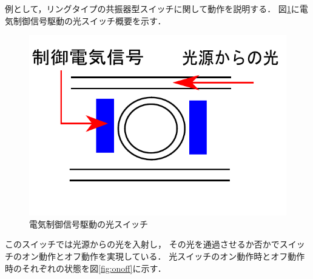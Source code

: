 例として，リングタイプの共振器型スイッチに関して動作を説明する．
図\ref{fig:swich6}に電気制御信号駆動の光スイッチ概要を示す．
\begin{figure}[t!]
 \begin{center}
  \includegraphics[keepaspectratio,scale=0.7]{fig/3/swich6.pdf}
  \caption{電気制御信号駆動の光スイッチ}
  \label{fig:swich6}
 \end{center}
\end{figure}
このスイッチでは光源からの光を入射し，
その光を通過させるか否かでスイッチのオン動作とオフ動作を実現している．
光スイッチのオン動作時とオフ動作時のそれぞれの状態を図\ref{fig:onoff}に示す．
